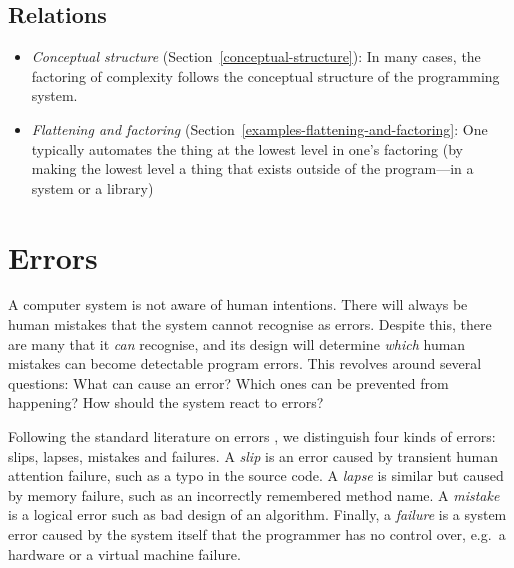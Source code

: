 \documentclass[ twoside,openright,titlepage,numbers=noenddot,headinclude,footinclude,cleardoublepage=empty,abstract=on,
                BCOR=5mm,paper=a4,fontsize=11pt
                ]{scrreprt}
\newcommand{\joel}[1]{}
\newcommand{\note}[1]{}
\providecommand{\tightlist}{}\newenvironment{longtable}[2]{\begin{tabular}}{\end{tabular}}
\theoremstyle{definition}
\begin{document}
\joel{include a definition and discussion of "boilerplate" code!}
\note{Tomas: I removed references here, because I could not think of anything else to add here. I guess it makes sense to keep those optional..}

\hypertarget{relations-3}{\subsection{Relations}\label{relations-3}}

\begin{itemize}
\tightlist
\item
  \emph{Conceptual structure} (Section~\ref{conceptual-structure}): In
  many cases, the factoring of complexity follows the conceptual
  structure of the programming system.
\item
  \emph{Flattening and factoring}
  (Section~\ref{examples-flattening-and-factoring}: One typically
  automates the thing at the lowest level in one's factoring (by making
  the lowest level a thing that exists outside of the program---in a
  system or a library)
\end{itemize}

\hypertarget{errors}{\section{Errors}\label{errors}}


A computer system is not aware of human intentions. There will always be
human mistakes that the system cannot recognise as errors. Despite this,
there are many that it \emph{can} recognise, and its design will
determine \emph{which} human mistakes can become detectable program
errors. This revolves around several questions: What can cause an error?
Which ones can be prevented from happening? How should the system react
to errors?

Following the standard literature on errors \parencite{HumanError}, we
distinguish four kinds of errors: slips, lapses, mistakes and failures.
A \emph{slip} is an error caused by transient human attention failure,
such as a typo in the source code. A \emph{lapse} is similar but caused
by memory failure, such as an incorrectly remembered method name. A
\emph{mistake} is a logical error such as bad design of an algorithm.
Finally, a \emph{failure} is a system error caused by the system itself
that the programmer has no control over, e.g.~a hardware or a virtual
machine failure.
\end{document}
